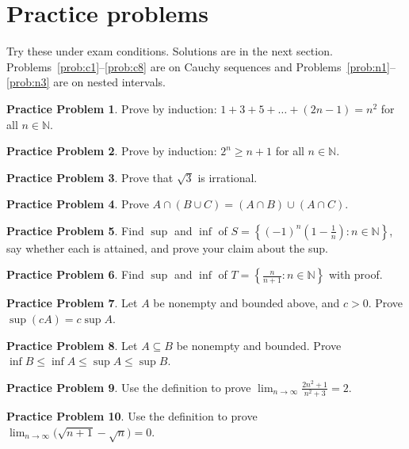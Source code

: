\documentclass[11pt]{article}
\theoremstyle{definition}
\newtheorem{prob}{Practice Problem}
\newcommand{\N}{\mathbb{N}}
\begin{document}
\newpage
\section{Practice problems}
\label{sec:practice}
Try these under exam conditions. Solutions are in the next section.
Problems~\ref{prob:c1}--\ref{prob:c8} are on Cauchy sequences and
Problems~\ref{prob:n1}--\ref{prob:n3} are on nested intervals.

\begin{prob}
Prove by induction: $1+3+5+\dots+(2n-1)=n^2$ for all $n\in\N$.
\end{prob}

\begin{prob}
Prove by induction: $2^n\ge n+1$ for all $n\in\N$.
\end{prob}

\begin{prob}
Prove that $\sqrt3$ is irrational.
\end{prob}

\begin{prob}
Prove $A\cap(B\cup C)=(A\cap B)\cup(A\cap C)$.
\end{prob}

\begin{prob}
Find $\sup$ and $\inf$ of $S=\left\{(-1)^n\left(1-\frac1n\right):n\in\N\right\}$,
say whether each is attained, and prove your claim about the sup.
\end{prob}

\begin{prob}
Find $\sup$ and $\inf$ of $T=\left\{\frac{n}{n+1}:n\in\N\right\}$ with
proof.
\end{prob}

\begin{prob}
Let $A$ be nonempty and bounded above, and $c>0$. Prove
$\sup(cA)=c\sup A$.
\end{prob}

\begin{prob}
Let $A\subseteq B$ be nonempty and bounded. Prove $\inf B\le\inf A\le\sup A\le\sup B$.
\end{prob}

\begin{prob}
Use the definition to prove $\displaystyle\lim_{n\to\infty}\frac{2n^2+1}{n^2+3}=2$.
\end{prob}

\begin{prob}
Use the definition to prove $\displaystyle\lim_{n\to\infty}\bigl(\sqrt{n+1}-\sqrt n\bigr)=0$.
\end{prob}
\end{document}
